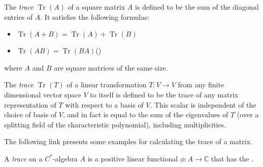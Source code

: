 \documentclass{article}
\begin{document}
The {\em trace} $\operatorname{Tr}(A)$ of a square matrix $A$ is defined to be the sum of the diagonal entries of $A$. It satisfies the following formulas:
\begin{itemize}
\item $\operatorname{Tr}(A+B) = \operatorname{Tr}(A) + \operatorname{Tr}(B)$
\item $\operatorname{Tr}(AB) = \operatorname{Tr}(BA)$\quad\quad ()
\end{itemize}
where $A$ and $B$ are square matrices of the same size.

The {\em trace} $\operatorname{Tr}(T)$ of a linear transformation $T\colon V \longrightarrow V$ from any finite dimensional vector space $V$ to itself is defined to be the trace of any matrix representation of $T$ with respect to a basis of $V$. This scalar is independent of the choice of basis of $V$, and in fact is equal to the sum of the eigenvalues of $T$ (over a splitting field of the characteristic polynomial), including multiplicities.

The following link presents some examples for calculating the trace of a matrix.

A {\em trace} on a $C^*$-algebra $A$ is a positive linear functional $\phi\colon A\to\mathbb{C}$ that has the .
\end{document}
